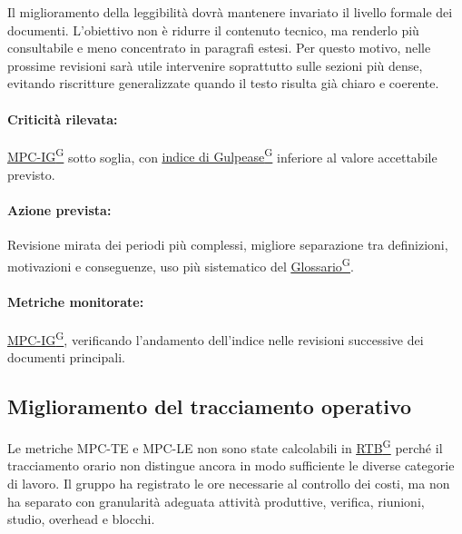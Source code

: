 \documentclass[a4paper,12pt]{article}
\providecommand{\glslink}[2]{\href{https://alittlebyte-19.github.io/Documentazione/glossario.html\#gls-#1}{\underline{#2}\textsuperscript{\scriptsize G}}}
\begin{document}
Il miglioramento della leggibilità dovrà mantenere invariato il livello formale dei documenti. L'obiettivo non è ridurre il contenuto tecnico, ma renderlo più consultabile e meno concentrato in paragrafi estesi. Per questo motivo, nelle prossime revisioni sarà utile intervenire soprattutto sulle sezioni più dense, evitando riscritture generalizzate quando il testo risulta già chiaro e coerente.

\paragraph*{Criticità rilevata:} \glslink{indice-di-gulpease-mpc-ig}{MPC-IG} sotto soglia, con \glslink{indice-di-gulpease-mpc-ig}{indice di Gulpease} inferiore al valore accettabile previsto.

\paragraph*{Azione prevista:} Revisione mirata dei periodi più complessi, migliore separazione tra definizioni, motivazioni e conseguenze, uso più sistematico del \glslink{glossario}{Glossario}.

\paragraph*{Metriche monitorate:} \glslink{indice-di-gulpease-mpc-ig}{MPC-IG}, verificando l'andamento dell'indice nelle revisioni successive dei documenti principali.

\subsection{Miglioramento del tracciamento operativo}

Le metriche MPC-TE e MPC-LE non sono state calcolabili in \glslink{rtb-requirements-and-technology-baseline}{RTB} perché il tracciamento orario non distingue ancora in modo sufficiente le diverse categorie di lavoro. Il gruppo ha registrato le ore necessarie al controllo dei costi, ma non ha separato con granularità adeguata attività produttive, verifica, riunioni, studio, overhead e blocchi.
\end{document}
